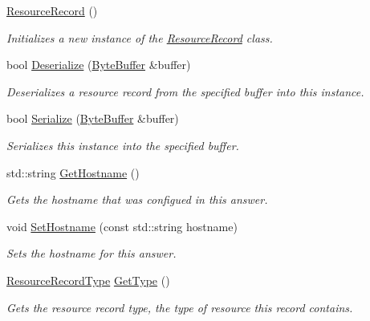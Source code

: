 \begin{DoxyCompactItemize}
\item 
\hyperlink{class_senergy_1_1_dns_1_1_resource_record_a5031132589becf3c4e8e4ecbd6ab4e5d}{Resource\-Record} ()
\begin{DoxyCompactList}\small\item\em Initializes a new instance of the \hyperlink{class_senergy_1_1_dns_1_1_resource_record}{Resource\-Record} class. \end{DoxyCompactList}\item 
bool \hyperlink{class_senergy_1_1_dns_1_1_resource_record_a4426ad69fd06a352835b00d18fd726a7}{Deserialize} (\hyperlink{class_senergy_1_1_byte_buffer}{Byte\-Buffer} \&buffer)
\begin{DoxyCompactList}\small\item\em Deserializes a resource record from the specified buffer into this instance. \end{DoxyCompactList}\item 
bool \hyperlink{class_senergy_1_1_dns_1_1_resource_record_ad76b4f450fc1d7f0bd0bbf72c3f68a11}{Serialize} (\hyperlink{class_senergy_1_1_byte_buffer}{Byte\-Buffer} \&buffer)
\begin{DoxyCompactList}\small\item\em Serializes this instance into the specified buffer. \end{DoxyCompactList}\item 
std\-::string \hyperlink{class_senergy_1_1_dns_1_1_resource_record_a98a7d65be5a756f190247e18a5433661}{Get\-Hostname} ()
\begin{DoxyCompactList}\small\item\em Gets the hostname that was configued in this answer. \end{DoxyCompactList}\item 
void \hyperlink{class_senergy_1_1_dns_1_1_resource_record_a571a18bfcdcc2e5ac0faa2e9cfac57fb}{Set\-Hostname} (const std\-::string hostname)
\begin{DoxyCompactList}\small\item\em Sets the hostname for this answer. \end{DoxyCompactList}\item 
\hyperlink{namespace_senergy_1_1_dns_a590bfd748c955364770f5ce358d9dfe0}{Resource\-Record\-Type} \hyperlink{class_senergy_1_1_dns_1_1_resource_record_a53ff0c81f7f0b79ac69df28a513242e2}{Get\-Type} ()
\begin{DoxyCompactList}\small\item\em Gets the resource record type, the type of resource this record contains. \end{DoxyCompactList}\item 

\end{DoxyCompactItemize}
